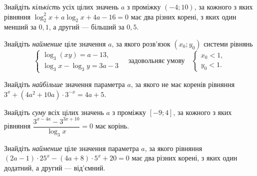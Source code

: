 \documentclass[12pt]{article}
\begin{document}
\begin{samepage}
\noindent\zadnum Знайдіть \textit{кількість} усіх цілих значень $a$ з проміжку $(-4; 10)$, за кожного з яких рівняння $\log_2^2 x + a\log_2 x + 4a - 16 = 0$ має два різних корені, з яких один менший за $0{,}1$, а другий --- більший за $0{,}5$. 

\nmtnobreak
\nopagebreak\nbvspace{0.3cm}
\nmtAnswerBox
\par{}
\end{samepage}

\begin{samepage}
\noindent\zadnum Знайдіть \textit{найменше} ціле значення $a$, за якого розв'язок $(x_0; y_0)$ системи рівнянь
$$
\begin{cases}
\log_3(xy) = a - 13, \\
\log_3 x - \log_3 y = 3a - 3
\end{cases}
\quad \text{задовольняє умову} \quad
\begin{cases}
x_0 < 1, \\
y_0 < 1.
\end{cases}
$$ 

\nmtnobreak
\nopagebreak\nbvspace{0.3cm}
\nmtAnswerBox
\par{}
\end{samepage}

\begin{samepage}
\noindent\zadnum Знайдіть \textit{найбільше} значення параметра $a$, за якого не має коренів рівняння $3^x + (4a^2 + 10a) \cdot 3^{-x} = 4a + 5$. 

\nmtnobreak
\nopagebreak\nbvspace{0.3cm}
\nmtAnswerBox
\par{}
\end{samepage}

\begin{samepage}
\noindent\zadnum Знайдіть \textit{суму} всіх цілих значень $a$ з проміжку $[-9; 4]$, за кожного з яких рівняння $\dfrac{3^{x - 4a} - 3^{3x + 10}}{\log_3 x} = 0$ має корінь. 

\nmtnobreak
\nopagebreak\nbvspace{0.3cm}
\nmtAnswerBox
\par{}
\end{samepage}

\begin{samepage}
\noindent\zadnum Знайдіть \textit{найменше} ціле значення параметра $a$, за якого рівняння $(2a - 1) \cdot 25^x - (4a + 8) \cdot 5^x + 20 = 0$ має два різних корені, з яких один додатний, а другий --- від'ємний. 

\nmtnobreak
\nopagebreak\nbvspace{0.3cm}
\nmtAnswerBox
\par{}
\end{samepage}
\end{document}
